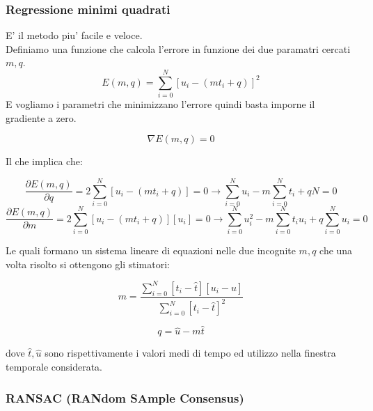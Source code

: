 \documentclass{article}
\begin{document}
\subsubsection{Regressione minimi quadrati}
E' il metodo piu' facile e veloce.\\
Definiamo una funzione che calcola l'errore in funzione dei due paramatri cercati \(m, q\).
\[E(m, q) = \sum_{i = 0}^N \left[u_i - (m t_i + q)\right]^2\]
E vogliamo i parametri che minimizzano l'errore quindi basta imporne il gradiente a zero.

\[\nabla E(m, q) = 0\]

Il che implica che:

\[\frac{\partial E(m, q)}{\partial q} = 2\sum_{i = 0}^N \left[u_i - (m t_i + q)\right] = 0 \rightarrow  \sum_{i = 0}^N u_i - m \sum_{i = 0}^N t_i + q N = 0\]
\[\frac{\partial E(m, q)}{\partial m} = 2\sum_{i = 0}^N \left[u_i - (m t_i + q)\right] \left[u_i\right] = 0 \rightarrow \sum_{i = 0}^N u_i^2 - m \sum_{i = 0}^N t_i u_i + q\sum_{i = 0}^N u_i =  0\]

Le quali formano un sistema lineare di equazioni nelle due incognite \(m, q\) che una volta risolto si ottengono gli stimatori:

\[m = \frac{\sum_{i = 0}^N \left[t_i - \hat{t}\right]\left[u_i - \hat{u}\right]}{\sum_{i = 0}^N \left[t_i - \hat{t}\right]^2}\]

\[q = \hat{u} - m \hat{t} \]

dove \(\hat{t}, \hat{u}\) sono rispettivamente i valori medi di tempo ed utilizzo nella finestra temporale considerata.


\subsubsection{RANSAC (RANdom SAmple Consensus)}
\end{document}
